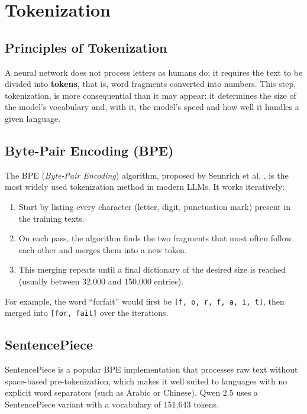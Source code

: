 \documentclass[12pt, a4paper]{report}
\newcommand{\sourced}[1]{#1}        %
\newcommand{\humantext}[1]{#1}      %
\begin{document}
\section{Tokenization}

\subsection{Principles of Tokenization}
\humantext{A neural network does not process letters as humans do; it requires the text to be divided into \textbf{tokens}, that is, word fragments converted into numbers. This step, tokenization, is more consequential than it may appear: it determines the size of the model's vocabulary and, with it, the model's speed and how well it handles a given language.}

\subsection{Byte-Pair Encoding (BPE)}
\sourced{The BPE (\textit{Byte-Pair Encoding}) algorithm, proposed by Sennrich et al. \cite{sennrich2016bpe}, is the most widely used tokenization method in modern LLMs. It works iteratively:}
\begin{enumerate}[noitemsep]
    \item \humantext{Start by listing every character (letter, digit, punctuation mark) present in the training texts.}
    \item \humantext{On each pass, the algorithm finds the two fragments that most often follow each other and merges them into a new token.}
    \item \humantext{This merging repeats until a final dictionary of the desired size is reached (usually between 32{,}000 and 150{,}000 entries).}
\end{enumerate}

\humantext{For example, the word ``forfait'' would first be \texttt{[f, o, r, f, a, i, t]}, then merged into \texttt{[for, fait]} over the iterations.}

\subsection{SentencePiece}
\sourced{SentencePiece \cite{kudo2018sentencepiece} is a popular BPE implementation that processes raw text without space-based pre-tokenization, which makes it well suited to languages with no explicit word separators (such as Arabic or Chinese).} \humantext{Qwen 2.5 uses a SentencePiece variant with a vocabulary of 151{,}643 tokens.}
\end{document}
